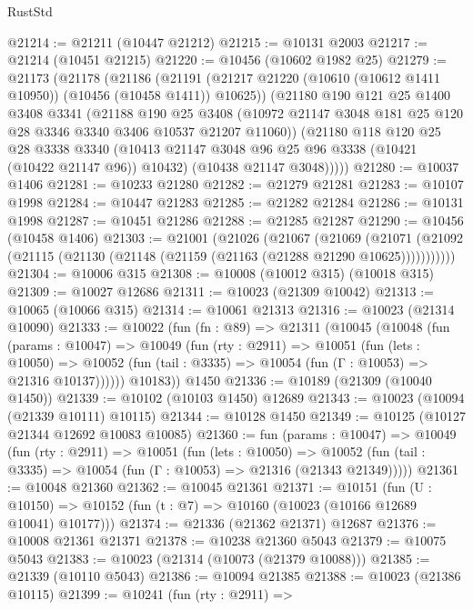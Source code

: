 \begin{lexlean}{RustStd}
\begin{coremodule}
@21214 := @21211 (@10447 @21212)
@21215 := @10131 @2003
@21217 := @21214 (@10451 @21215)
@21220 := @10456 (@10602 @1982 @25)
@21279 := @21173
    (@21178
      (@21186
        (@21191 (@21217 @21220 (@10610 (@10612 @1411 @10950)) (@10456 (@10458 @1411)) @10625))
        (@21180
          @190
          @121
          @25
          @1400
          @3408
          @3341
          (@21188
            @190
            @25
            @3408
            (@10972 @21147 @3048 @181 @25 @120 @28 @3346 @3340 @3406 @10537 @21207 @11060))
          (@21180
            @118
            @120
            @25
            @28
            @3338
            @3340
            (@10413 @21147 @3048 @96 @25 @96 @3338 (@10421 (@10422 @21147 @96)) @10432)
            (@10438 @21147 @3048)))))
@21280 := @10037 @1406
@21281 := @10233 @21280
@21282 := @21279 @21281
@21283 := @10107 @1998
@21284 := @10447 @21283
@21285 := @21282 @21284
@21286 := @10131 @1998
@21287 := @10451 @21286
@21288 := @21285 @21287
@21290 := @10456 (@10458 @1406)
@21303 := @21001
    (@21026
      (@21067
        (@21069
          (@21071 (@21092 (@21115 (@21130 (@21148 (@21159 (@21163 (@21288 @21290 @10625)))))))))))
@21304 := @10006 @315
@21308 := @10008 (@10012 @315) (@10018 @315)
@21309 := @10027 @12686
@21311 := @10023 (@21309 @10042)
@21313 := @10065 (@10066 @315)
@21314 := @10061 @21313
@21316 := @10023 (@21314 @10090)
@21333 := @10022
    (fun (fn : @89) =>
    @21311
      (@10045
        (@10048
          (fun (params : @10047) =>
          @10049
            (fun (rty : @2911) =>
            @10051
              (fun (lets : @10050) =>
              @10052 (fun (tail : @3335) => @10054 (fun (Γ : @10053) => @21316 @10137))))))
        @10183))
    @1450
@21336 := @10189 (@21309 (@10040 @1450))
@21339 := @10102 (@10103 @1450) @12689
@21343 := @10023 (@10094 (@21339 @10111) @10115)
@21344 := @10128 @1450
@21349 := @10125 (@10127 @21344 @12692 @10083 @10085)
@21360 := fun (params : @10047) =>
  @10049
    (fun (rty : @2911) =>
    @10051
      (fun (lets : @10050) =>
      @10052 (fun (tail : @3335) => @10054 (fun (Γ : @10053) => @21316 (@21343 @21349)))))
@21361 := @10048 @21360
@21362 := @10045 @21361
@21371 := @10151
    (fun (U : @10150) => @10152 (fun (t : @7) => @10160 (@10023 (@10166 @12689 @10041) @10177)))
@21374 := @21336 (@21362 @21371) @12687
@21376 := @10008 @21361 @21371
@21378 := @10238 @21360 @5043
@21379 := @10075 @5043
@21383 := @10023 (@21314 (@10073 (@21379 @10088)))
@21385 := @21339 (@10110 @5043)
@21386 := @10094 @21385
@21388 := @10023 (@21386 @10115)
@21399 := @10241
    (fun (rty : @2911) =>

\end{coremodule}
\end{lexlean}
